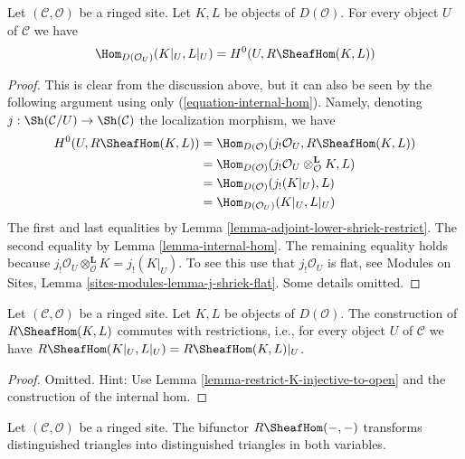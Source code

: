 \begin{lemma}
\label{lemma-section-RHom-over-U}
Let $(\mathcal{C}, \mathcal{O})$ be a ringed site. Let $K, L$ be objects
of $D(\mathcal{O})$. For every object $U$ of $\mathcal{C}$ we have
$$
\Hom_{D(\mathcal{O}_U)}(K|_U, L|_U) =
H^0(U, R\SheafHom(K, L))
$$
\end{lemma}

\begin{proof}
This is clear from the discussion above, but it can also be seen by
the following argument using only (\ref{equation-internal-hom}).
Namely, denoting $j : \Sh(\mathcal{C}/U) \to \Sh(\mathcal{C})$ the localization
morphism, we have
\begin{align*}
H^0(U, R\SheafHom(K, L))
& =
\Hom_{D(\mathcal{O})}(j_!\mathcal{O}_U, R\SheafHom(K, L)) \\
& =
\Hom_{D(\mathcal{O})}(
j_!\mathcal{O}_U \otimes_\mathcal{O}^\mathbf{L} K, L) \\
& =
\Hom_{D(\mathcal{O})}(j_!(K|_U), L) \\
& =
\Hom_{D(\mathcal{O}_U)}(K|_U, L|_U)
\end{align*}
The first and last equalities by
Lemma \ref{lemma-adjoint-lower-shriek-restrict}.
The second equality by Lemma \ref{lemma-internal-hom}.
The remaining equality holds because
$j_!\mathcal{O}_U \otimes_\mathcal{O}^\mathbf{L} K = j_!(K|_U)$.
To see this use that $j_!\mathcal{O}_U$ is flat, see
Modules on Sites, Lemma \ref{sites-modules-lemma-j-shriek-flat}.
Some details omitted.
\end{proof}

\begin{lemma}
\label{lemma-restriction-RHom-to-U}
Let $(\mathcal{C}, \mathcal{O})$ be a ringed site. Let $K, L$ be objects
of $D(\mathcal{O})$. The construction of $R\SheafHom(K, L)$
commutes with restrictions, i.e.,
for every object $U$ of $\mathcal{C}$ we have
$R\SheafHom(K|_U, L|_U) = R\SheafHom(K, L)|_U$.
\end{lemma}

\begin{proof}
Omitted. Hint: Use Lemma \ref{lemma-restrict-K-injective-to-open}
and the construction of the internal hom.
\end{proof}

\begin{lemma}
\label{lemma-RHom-triangulated}
Let $(\mathcal{C}, \mathcal{O})$ be a ringed site. The bifunctor
$R\SheafHom(- , -)$ transforms distinguished triangles into
distinguished triangles in both variables.
\end{lemma}

